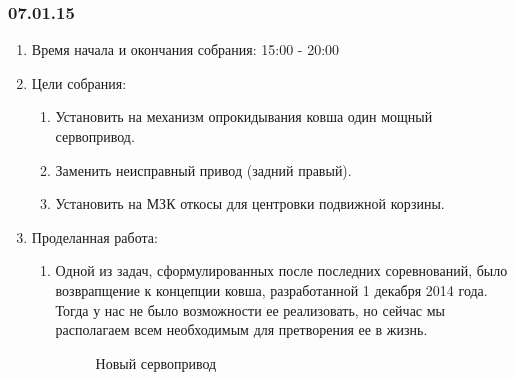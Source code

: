 \subsubsection{07.01.15}

\begin{enumerate}
	\item Время начала и окончания собрания: 15:00 - 20:00
	
	\item Цели собрания: 
	\begin{enumerate}
		\item Установить на механизм опрокидывания ковша один мощный сервопривод.
		
		\item Заменить неисправный привод (задний правый).
		
		\item Установить на МЗК откосы для центровки подвижной корзины.
	\end{enumerate}
	
	\item Проделанная работа:
	\begin{enumerate}
		
	  \item Одной из задач, сформулированных после последних соревнований, было возврапщение к концепции ковша, разработанной 1 декабря 2014 года. Тогда у нас не было возможности ее реализовать, но сейчас мы располагаем всем необходимым для претворения ее в жизнь.
	  \begin{figure}[H]
	  	\begin{minipage}[h]{1\linewidth}
	  		\caption{Новый сервопривод}
	  	\end{minipage}
	  \end{figure}
	  

\end{enumerate}
\end{enumerate}
